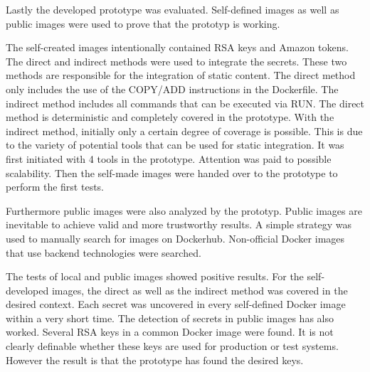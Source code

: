 Lastly the developed prototype was evaluated. 
Self-defined images as well as public images were used to prove that the prototyp is working.

The self-created images intentionally contained RSA keys and Amazon tokens.
The direct and indirect methods were used to integrate the secrets.
These two methods are responsible for the integration of static content.
The direct method only includes the use of the COPY/ADD instructions in the Dockerfile.
The indirect method includes all commands that can be executed via RUN.
The direct method is deterministic and completely covered in the prototype.
With the indirect method, initially only a certain degree of coverage is possible.
This is due to the variety of potential tools that can be used for static integration.
It was first initiated with 4 tools in the prototype. Attention was paid to possible scalability.
Then the self-made images were handed over to the prototype to perform the first tests.

Furthermore public images were also analyzed by the prototyp.
Public images are inevitable to achieve valid and more trustworthy results.
A simple strategy was used to manually search for images on Dockerhub.
Non-official Docker images that use backend technologies were searched.

The tests of local and public images showed positive results.
For the self-developed images, the direct as well as the indirect method was covered in the desired context.
Each secret was uncovered in every self-defined Docker image within a very short time.
The detection of secrets in public images has also worked.
Several RSA keys in a common Docker image were found.
It is not clearly definable whether these keys are used for production or test systems.
However the result is that the prototype has found the desired keys.





